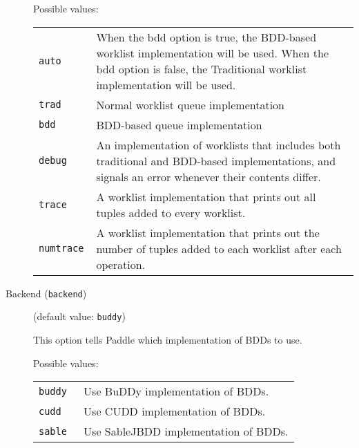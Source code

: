 \documentclass{article}
\begin{document}
\begin{description}
Possible values:\\
\begin{longtable}{p{1in}p{4in}}

{\tt auto }
&

When the bdd option is true, the BDD-based worklist implementation will be used.
When the bdd option is false, the Traditional worklist implementation will be used.
\\

{\tt trad }
&

Normal worklist queue implementation
\\

{\tt bdd }
&

BDD-based queue implementation
\\

{\tt debug }
&

An implementation of worklists that includes both traditional and BDD-based
implementations, and signals an error whenever their contents differ.
\\

{\tt trace }
&

A worklist implementation that prints out all tuples added to every worklist.
\\

{\tt numtrace }
&

A worklist implementation that prints out the number of tuples added to
each worklist after each operation.
\\

\end{longtable}


\item[Backend ({\tt backend})]
(default value: {\tt buddy})




This option tells Paddle which implementation of BDDs to use.
        



Possible values:\\
\begin{longtable}{p{1in}p{4in}}

{\tt buddy }
&

Use BuDDy implementation of BDDs.
\\

{\tt cudd }
&

Use CUDD implementation of BDDs.
\\

{\tt sable }
&
Use SableJBDD implementation of BDDs.\\


\end{longtable}
\end{description}
\end{document}
